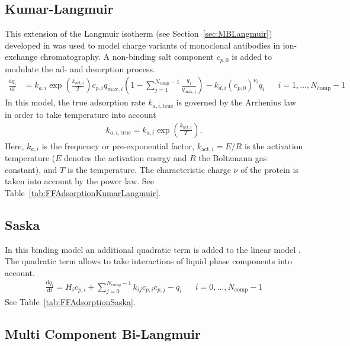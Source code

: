 \subsection{Kumar-Langmuir}

This extension of the Langmuir isotherm (see Section~\ref{sec:MBLangmuir}) developed in \cite{Kumar2015} was used to model charge variants of monoclonal antibodies in ion-exchange chromatography. 
A non-binding salt component $c_{p,0}$ is added to modulate the ad- and desorption process.
\begin{align*}
  \frac{\mathrm{d} q_i}{\mathrm{d} t} &= k_{a,i} \exp\left( \frac{k_{\text{act},i}}{T} \right) c_{p,i} q_{\text{max},i} \left( 1 - \sum_{j=1}^{N_{\text{comp}} - 1} \frac{q_j}{q_{\text{max},j}} \right) - k_{d,i} \left( c_{p,0} \right)^{\nu_i} q_i && i = 1, \dots, N_{\text{comp}} - 1
\end{align*}
In this model, the true adsorption rate $k_{a,i,\text{true}}$ is governed by the Arrhenius law in order to take temperature into account
\begin{align*}
  k_{a,i,\text{true}} = k_{a,i} \exp\left( \frac{k_{\text{act},i}}{T} \right).
\end{align*}
Here, $k_{a,i}$ is the frequency or pre-exponential factor, $k_{\text{act},i} = E / R$ is the activation temperature ($E$ denotes the activation energy and $R$ the Boltzmann gas constant), and $T$ is the temperature.
The characteristic charge $\nu$ of the protein is taken into account by the power law.
See Table~\ref{tab:FFAdsorptionKumarLangmuir}.

\subsection{Saska}

In this binding model an additional quadratic term is added to the linear model \cite{Saska1992}. 
The quadratic term allows to take interactions of liquid phase components into account.
\begin{align*}
  \frac{\mathrm{d} q_i}{\mathrm{d} t} = H_i c_{p,i} + \sum_{j=0}^{N_{\text{comp}} - 1} k_{ij} c_{p,i} c_{p,j} - q_i && i = 0, \dots, N_{\text{comp}} - 1
\end{align*}
See Table~\ref{tab:FFAdsorptionSaska}.

\subsection{Multi Component Bi-Langmuir}\label{sec:MBBiLangmuir}

